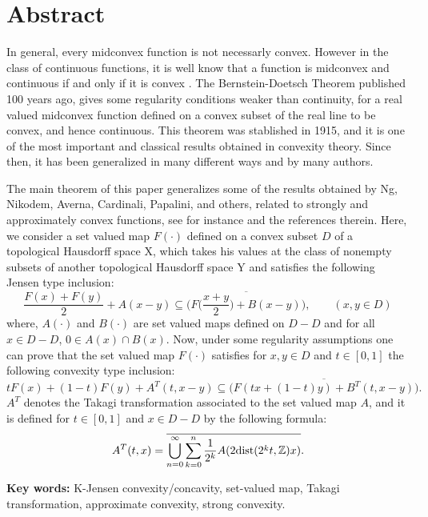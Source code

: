 \chapter*{Abstract}
In general, every midconvex function is not necessarly convex. However in the class of 
continuous functions, it is well know that a function is midconvex and  continuous 
if and only if it is convex \cite{Kuc09}. The Bernstein-Doetsch Theorem published 100 years ago, gives some regularity 
conditions weaker than continuity, for a real valued  midconvex function defined on a 
convex subset of the real line to be convex, and hence continuous. 
This theorem was stablished  in 1915, and it is one of the most important and classical 
results obtained in convexity theory. Since then, it has been generalized in many 
different ways and by many authors. 

The main theorem of this paper generalizes some of the results  obtained by Ng, Nikodem,
Averna, Cardinali, Papalini, and others, related to strongly and approximately convex
functions, see for instance \cite{MakPal10b,MakPal13b,Nik89} and the references therein. 
Here, we consider a set valued map $F(\cdot)$ defined on a convex subset $D$ of a 
topological Hausdorff space X, which takes his values at the class of nonempty subsets 
of another topological Hausdorff space Y and satisfies the following Jensen type inclusion:
$$
\frac{F(x)+F(y)}2 + A(x-y) \subseteq \overline{\bigg(F\bigg(\frac{x+y}2\bigg)+B(x-y)\bigg)},
\qquad
(x,y\in D)
$$
where, $A(\cdot)$ and $B(\cdot)$ are set valued maps defined on $D-D$ and for all $x\in D-D$,
$0\in A(x)\cap B(x)$. Now, under some regularity assumptions  
one can prove that the set valued map $F(\cdot)$ satisfies for $x,y\in D$ and $t\in[0,1]$
the following convexity type inclusion:
$$
tF(x)+(1-t)F(y) + A^T(t,x-y) \subseteq \overline{\bigg(F(tx+(1-t)y)+B^T(t,x-y)\bigg)}.
$$
$A^T$ denotes the Takagi transformation associated to the set valued map $A$, 
and it is defined for $t\in[0,1]$ and $x\in D- D$ by the following formula:
$$
A^T(t,x) = \overline{\bigcup_{n=0}^{\infty}\sum_{k=0}^n{\frac1{2^k}A(2\mbox{dist}(2^kt,\mathbb{Z})x)}}.
$$


{\bf Key words:} K-Jensen convexity/concavity, set-valued map, Takagi transformation, approximate convexity,
strong convexity.
